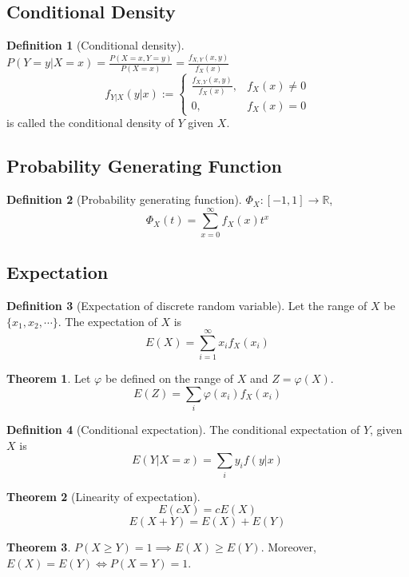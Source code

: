 \documentclass[10pt, a4paper]{extarticle}
\theoremstyle{definition}
\newtheorem{thm}{Theorem}
\newtheorem{defn}{Definition}
\begin{document}
	\subsection{Conditional Density}
	\begin{defn}[Conditional density]
		$P(Y=y|X=x)=\frac{P(X=x,Y=y)}{P(X=x)}=\frac{f_{X,Y}(x,y)}{f_X(x)}$
		\[f_{Y|X}(y|x):=
			\begin{cases}
				\frac{f_{X,Y}(x,y)}{f_X(x)},&f_X(x)\neq 0\\
				0,&f_X(x)=0
			\end{cases}
		\]
		is called the conditional density of $Y$ given $X$.
	\end{defn}
	
	\subsection{Probability Generating Function}
	\begin{defn}[Probability generating function]
		$\Phi_X:[-1,1]\to\mathbb{R}$,
		\[\Phi_X(t)=\sum_{x=0}^\infty f_X(x)t^x\]
	\end{defn}

	\subsection{Expectation}
	\begin{defn}[Expectation of discrete random variable]
		Let the range of $X$ be $\{x_1,x_2,\cdots\}$. The expectation of $X$ is
		\[E(X)=\sum_{i=1}^\infty x_if_X(x_i)\]
	\end{defn}

	\begin{thm}
		Let $\varphi$ be defined on the range of $X$ and $Z=\varphi(X)$.
		\[E(Z)=\sum_{i}\varphi(x_i)f_X(x_i)\]
	\end{thm}

	\begin{defn}[Conditional expectation]
		The conditional expectation of $Y$, given $X$ is
		\[E(Y|X=x)=\sum_iy_if(y|x)\]
	\end{defn}

	\begin{thm}[Linearity of expectation]
		\[E(cX)=cE(X)\]\[E(X+Y)=E(X)+E(Y)\]
	\end{thm}
	

	\begin{thm}
		$P(X\geq Y)=1\implies E(X)\geq E(Y)$. Moreover, $E(X)=E(Y)\iff P(X=Y)=1$.
	\end{thm}
\end{document}
